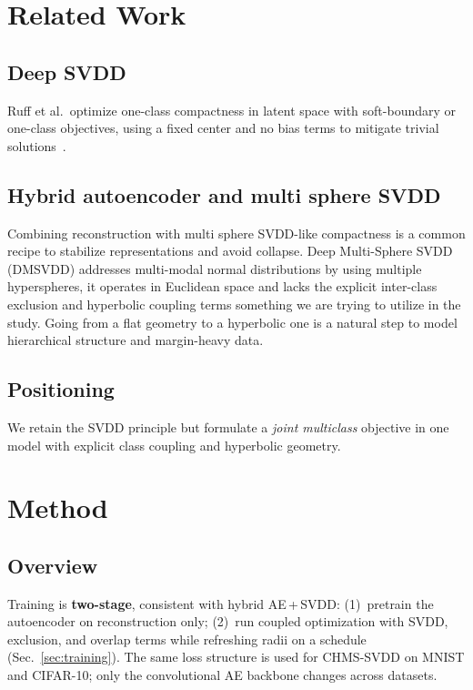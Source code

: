 \documentclass[conference]{IEEEtran}
\begin{document}
\section{Related Work}
\subsection{Deep SVDD}
Ruff et al.\ optimize one-class compactness in latent space with soft-boundary or one-class objectives, using a fixed center and no bias terms to mitigate trivial solutions~\cite{ruff2018deep}.

\subsection{Hybrid autoencoder and multi sphere SVDD}
Combining reconstruction with multi sphere SVDD-like compactness is a common recipe to stabilize representations and avoid collapse. Deep Multi-Sphere SVDD (DMSVDD) \cite{ghafoori2020dsmvdd} addresses multi-modal normal distributions by using multiple hyperspheres, it operates in Euclidean space and lacks the explicit inter-class exclusion and hyperbolic coupling terms something we are trying to utilize in the study. Going from a flat geometry to a hyperbolic one is a natural step to model hierarchical structure and margin-heavy data.

\subsection{Positioning}
We retain the SVDD principle but formulate a \emph{joint multiclass} objective in one model with explicit class coupling and hyperbolic geometry.

\section{Method}

\subsection{Overview}
Training is \textbf{two-stage}, consistent with hybrid AE\,+\,SVDD: (1)~pretrain the autoencoder on reconstruction only; (2)~run coupled optimization with SVDD, exclusion, and overlap terms while refreshing radii on a schedule (Sec.~\ref{sec:training}).
The same loss structure is used for CHMS-SVDD on MNIST and CIFAR-10; only the convolutional AE backbone changes across datasets.
\end{document}
